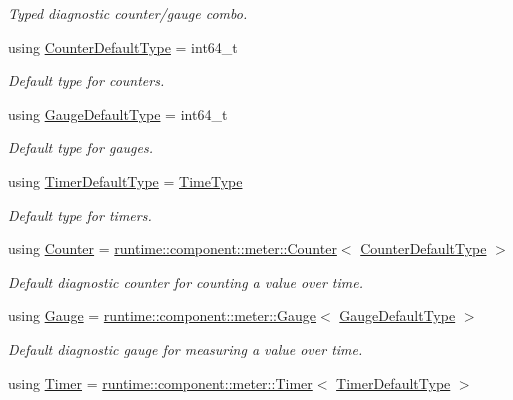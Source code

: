 \begin{DoxyCompactItemize}
\begin{DoxyCompactList}\small\item\em Typed diagnostic counter/gauge combo. \end{DoxyCompactList}\item 
using \hyperlink{namespacevt_1_1diagnostic_a23927eac6cae6ec4babd7b8437f163f1}{Counter\+Default\+Type} = int64\+\_\+t
\begin{DoxyCompactList}\small\item\em Default type for counters. \end{DoxyCompactList}\item 
using \hyperlink{namespacevt_1_1diagnostic_a32500a7e9e4ef4618d0084987ea40a8c}{Gauge\+Default\+Type} = int64\+\_\+t
\begin{DoxyCompactList}\small\item\em Default type for gauges. \end{DoxyCompactList}\item 
using \hyperlink{namespacevt_1_1diagnostic_a068855648cf3673d78a9c45a8a95f567}{Timer\+Default\+Type} = \hyperlink{namespacevt_a876a9d0cd5a952859c72de8a46881442}{Time\+Type}
\begin{DoxyCompactList}\small\item\em Default type for timers. \end{DoxyCompactList}\item 
using \hyperlink{namespacevt_1_1diagnostic_a55fcc9d6ffa285d1b085c01df2507d2f}{Counter} = \hyperlink{structvt_1_1runtime_1_1component_1_1meter_1_1_counter}{runtime\+::component\+::meter\+::\+Counter}$<$ \hyperlink{namespacevt_1_1diagnostic_a23927eac6cae6ec4babd7b8437f163f1}{Counter\+Default\+Type} $>$
\begin{DoxyCompactList}\small\item\em Default diagnostic counter for counting a value over time. \end{DoxyCompactList}\item 
using \hyperlink{namespacevt_1_1diagnostic_ad68069af499e2047c28d1852d77680ee}{Gauge} = \hyperlink{structvt_1_1runtime_1_1component_1_1meter_1_1_gauge}{runtime\+::component\+::meter\+::\+Gauge}$<$ \hyperlink{namespacevt_1_1diagnostic_a32500a7e9e4ef4618d0084987ea40a8c}{Gauge\+Default\+Type} $>$
\begin{DoxyCompactList}\small\item\em Default diagnostic gauge for measuring a value over time. \end{DoxyCompactList}\item 
using \hyperlink{namespacevt_1_1diagnostic_a84795feb3d3500ee2d7d59248499efb8}{Timer} = \hyperlink{structvt_1_1runtime_1_1component_1_1meter_1_1_timer}{runtime\+::component\+::meter\+::\+Timer}$<$ \hyperlink{namespacevt_1_1diagnostic_a068855648cf3673d78a9c45a8a95f567}{Timer\+Default\+Type} $>$

\end{DoxyCompactItemize}
